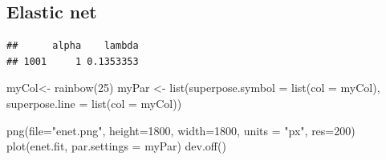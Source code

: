 \documentclass[
]{article}
\newenvironment{Shaded}{\begin{snugshade}}{\end{snugshade}}
\newcommand{\AttributeTok}[1]{\textcolor[rgb]{0.77,0.63,0.00}{#1}}
\newcommand{\DecValTok}[1]{\textcolor[rgb]{0.00,0.00,0.81}{#1}}
\newcommand{\FunctionTok}[1]{\textcolor[rgb]{0.00,0.00,0.00}{#1}}
\newcommand{\NormalTok}[1]{#1}
\newcommand{\OtherTok}[1]{\textcolor[rgb]{0.56,0.35,0.01}{#1}}
\newcommand{\SpecialCharTok}[1]{\textcolor[rgb]{0.00,0.00,0.00}{#1}}
\newcommand{\StringTok}[1]{\textcolor[rgb]{0.31,0.60,0.02}{#1}}
\begin{document}
\hypertarget{elastic-net}{%
\subsection{Elastic net}\label{elastic-net}}

\begin{Shaded}
\end{Shaded}

\begin{verbatim}
##      alpha    lambda
## 1001     1 0.1353353
\end{verbatim}

\begin{Shaded}
\begin{Highlighting}[]
\NormalTok{myCol}\OtherTok{\textless{}{-}} \FunctionTok{rainbow}\NormalTok{(}\DecValTok{25}\NormalTok{)}
\NormalTok{myPar }\OtherTok{\textless{}{-}} \FunctionTok{list}\NormalTok{(}\AttributeTok{superpose.symbol =} \FunctionTok{list}\NormalTok{(}\AttributeTok{col =}\NormalTok{ myCol),}
                    \AttributeTok{superpose.line =} \FunctionTok{list}\NormalTok{(}\AttributeTok{col =}\NormalTok{ myCol))}

\FunctionTok{png}\NormalTok{(}\AttributeTok{file=}\StringTok{"enet.png"}\NormalTok{, }\AttributeTok{height=}\DecValTok{1800}\NormalTok{, }\AttributeTok{width=}\DecValTok{1800}\NormalTok{, }\AttributeTok{units =} \StringTok{"px"}\NormalTok{, }\AttributeTok{res=}\DecValTok{200}\NormalTok{)    }
\FunctionTok{plot}\NormalTok{(enet.fit, }\AttributeTok{par.settings =}\NormalTok{ myPar)}
\FunctionTok{dev.off}\NormalTok{()}
\end{Highlighting}
\end{Shaded}
\end{document}
